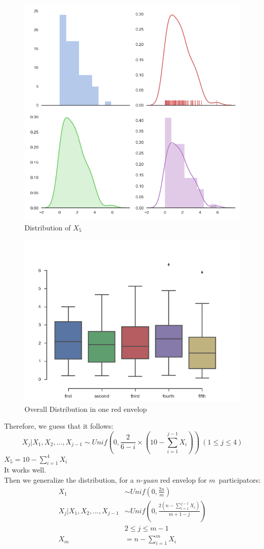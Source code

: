 \documentclass[10pt,journal]{IEEEtran}
\begin{document}
\begin{figure}[!ht]
\centering
\includegraphics[width=0.7\columnwidth,height=0.6\linewidth]{10_5.png}
\caption{Distribution of \(X_5\)}
\end{figure}
\begin{figure}[!ht]
	\centering
	\includegraphics[width=0.7\columnwidth,height=0.6\linewidth]{10_Overall.png}
	\caption{Overall Distribution in one red envelop}
\end{figure}
Therefore, we guess that it follows:
\begin{displaymath}
X_j|X_1,X_2,...,X_{j-1}\sim Unif(0,\frac{2}{6-i}\times(10-\sum_{i=1}^{j-1}X_i))\ (1\leq j\leq 4)
\end{displaymath}
\(X_5=10-\sum_{i=1}^{4}X_i\)
\\
It works well.
\\
Then we generalize the distribution, for a \(n\)-\emph{yuan} red envelop for \(m\)\ participators:
\[
	\begin{split}
		X_1&\sim Unif(0,\frac{2n}{m})
		\\
		X_j|X_1,X_2,...,X_{j-1}&\sim Unif(0,\frac{2(n-\sum_{i=1}^{j-1}X_i)}{m+1-j})
		\\
		&2\leq j\leq m-1
		\\
		X_m&=n-\sum_{i=1}^{m}X_i
	\end{split}
\]
\end{document}
